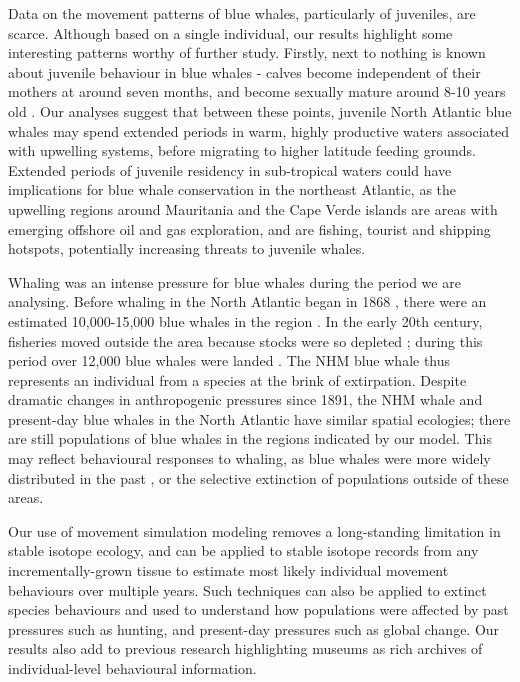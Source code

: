 \documentclass[a4paper,12pt]{article}
\begin{document}
Data on the movement patterns of blue whales, particularly of juveniles, are scarce. 
Although based on a single individual, our results highlight some interesting patterns worthy of further study.
Firstly, next to nothing is known about juvenile behaviour in blue whales - calves become independent of their mothers at around seven months, and become sexually mature around 8-10 years old \cite{handbook}.
Our analyses suggest that between these points, juvenile North Atlantic blue whales may spend extended periods in warm, highly productive waters associated with upwelling systems, before migrating to higher latitude feeding grounds.
Extended periods of juvenile residency in sub-tropical waters could have implications for blue whale conservation in the northeast Atlantic, as the upwelling regions around Mauritania and the Cape Verde islands are areas with emerging offshore oil and gas exploration, and are fishing, tourist and shipping hotspots, potentially increasing threats to juvenile whales. 

Whaling was an intense pressure for blue whales during the period we are analysing. 
Before whaling in the North Atlantic began in 1868 \cite{reilly2008balaenoptera}, there were an estimated 10,000-15,000 blue whales in the region \cite{sigurjonsson1995life}. 
In the early 20th century, fisheries moved outside the area because stocks were so depleted \cite{reilly2008balaenoptera}; during this period over 12,000 blue whales were landed \cite{sigurjonsson1995life}. 
The NHM blue whale thus represents an individual from a species at the brink of extirpation.
Despite dramatic changes in anthropogenic pressures since 1891, the NHM whale and present-day blue whales in the North Atlantic have similar spatial ecologies; there are still populations of blue whales in the regions indicated by our model. This may reflect behavioural responses to whaling, as blue whales were more widely distributed in the past \cite{reeves2004historical}, or the selective extinction of populations outside of these areas.

Our use of movement simulation modeling removes a long-standing limitation in stable isotope ecology, and can be applied to stable isotope records from any incrementally-grown tissue to estimate most likely individual movement behaviours over multiple years. 
Such techniques can also be applied to extinct species behaviours and used to understand how populations were affected by past pressures such as hunting, and present-day pressures such as global change. 
Our results also add to previous research \cite{lister2011natural,ryan2013stable} highlighting museums as rich archives of individual-level behavioural information.
\end{document}
